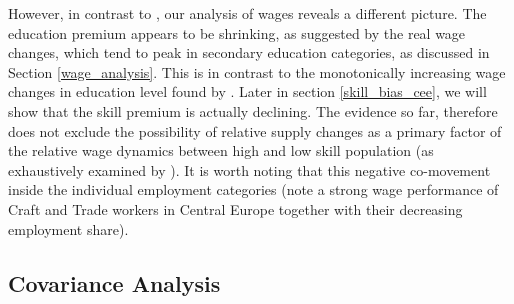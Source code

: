 \documentclass[11pt]{article}
\begin{document}
However, in contrast to \citeauthor{katz1992changes}, our analysis of wages reveals a different picture. The education premium appears to be shrinking, as suggested by the real wage changes, which tend to peak in secondary education categories, as discussed in Section \ref{wage_analysis}. This is in contrast to the monotonically increasing wage changes in education level found by \citeauthor{katz1992changes}. Later in section \ref{skill_bias_cee}, we will show that the skill premium is actually declining. The evidence so far, therefore does not exclude the possibility of relative supply changes as a primary factor of the relative wage dynamics between high and low skill population (as exhaustively examined by \citet{katz1992changes}).  It is worth noting that this negative co-movement inside the individual employment categories (note a strong wage performance of Craft and Trade workers in Central Europe together with their decreasing employment share).




\subsection{Covariance Analysis}\label{covariance_analysis}
\end{document}
